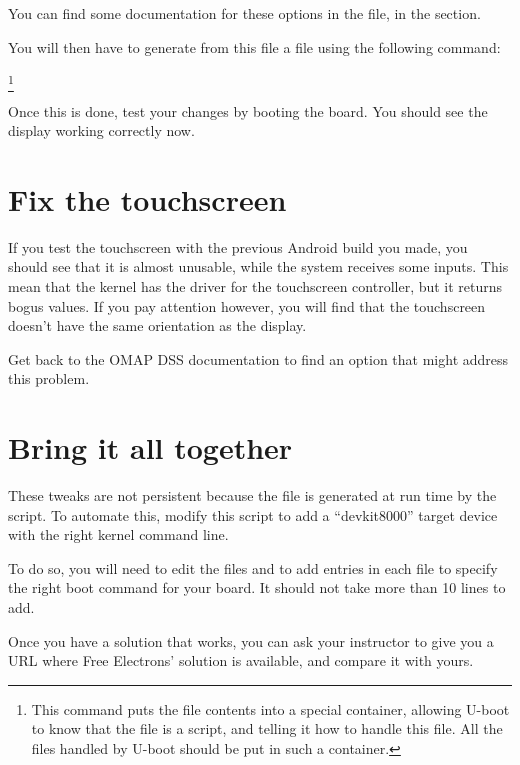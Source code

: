 You can find some documentation for these options in the
 file, in the
 section.

You will then have to generate from this  file a
 file using the following command:

\footnote{This command puts the  file contents into a special container,
allowing U-boot to know that the  file is a script, and telling it how to handle
this file. All the files handled by U-boot should be put in such a container.}
 
Once this is done, test your changes by booting the board. You should
see the display working correctly now.

\section{Fix the touchscreen}

If you test the touchscreen with the previous Android build you made,
you should see that it is almost unusable, while the system receives
some inputs. This mean that the kernel has the driver for the
touchscreen controller, but it returns bogus values. If you pay
attention however, you will find that the touchscreen doesn't have the
same orientation as the display.

Get back to the OMAP DSS documentation to find an option that might
address this problem.

\section{Bring it all together}

These tweaks are not persistent because the  file is
generated at run time by the 
script. To automate this, modify this script to add a ``devkit8000''
target device with the right kernel command line.

To do so, you will need to edit the files
 and
 to add
 entries in each file to specify the right boot command
for your board. It should not take more than 10 lines to add.

Once you have a solution that works, you can ask your instructor to
give you a URL where Free Electrons' solution is available, and
compare it with yours.


